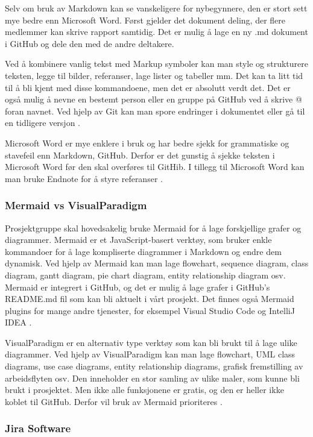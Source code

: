 Selv om bruk av Markdown kan se vanskeligere for nybegynnere, den er stort sett mye bedre enn Microsoft Word. Først gjelder det dokument deling, der flere medlemmer kan skrive rapport samtidig. Det er mulig å lage en ny .md dokument i GitHub og dele den med de andre deltakere.

Ved å kombinere vanlig tekst med Markup symboler kan man style og strukturere teksten, legge til bilder, referanser, lage lister og tabeller mm. Det kan ta litt tid til å bli kjent med disse kommandoene, men det er absolutt verdt det.
Det er også mulig å nevne en bestemt person eller en gruppe på GitHub ved å skrive @ foran navnet. Ved hjelp av Git kan man spore endringer i dokumentet eller gå til en tidligere versjon \cite{4-docs.github.com}.

Microsoft Word er mye enklere i bruk og har bedre sjekk for grammatiske og stavefeil enn Markdown, GitHub. Derfor er det gunstig å sjekke teksten i Microsoft Word før den skal overføres til GitHib. I tillegg til Microsoft Word kan man bruke Endnote for å styre referanser \cite{4-endnote.com}.  

\subsubsection*{Mermaid vs VisualParadigm}
 
Prosjektgruppe skal hovedsakelig bruke Mermaid for å lage forskjellige grafer og diagrammer. Mermaid er et JavaScript-basert verktøy, som bruker enkle kommandoer for å lage kompliserte diagrammer i Markdown og endre dem dynamisk. Ved hjelp av Mermaid kan man lage flowchart, sequence diagram, class diagram, gantt diagram, pie chart diagram, entity relationship diagram osv. Mermaid er integrert i GitHub, og det er mulig å lage grafer i GitHub’s README.md fil som kan bli aktuelt i vårt prosjekt. Det finnes også Mermaid plugins for mange andre tjenester, for eksempel Visual Studio Code og IntelliJ IDEA \cite{4-mermaid.js.org}.

VisualParadigm er en alternativ type verktøy som kan bli brukt til å lage ulike diagrammer. Ved hjelp av VisualParadigm kan man lage flowchart, UML class diagrams, use case diagrams, entity relationship diagrams, grafisk fremstilling av arbeidsflyten osv. Den inneholder en stor samling av ulike maler, som kunne bli brukt i prosjektet. Men ikke alle funksjonene er gratis, og den er heller ikke koblet til GitHub. Derfor vil bruk av Mermaid prioriteres \cite{4-visual-paradigm.com}.

\subsubsection*{Jira Software}

